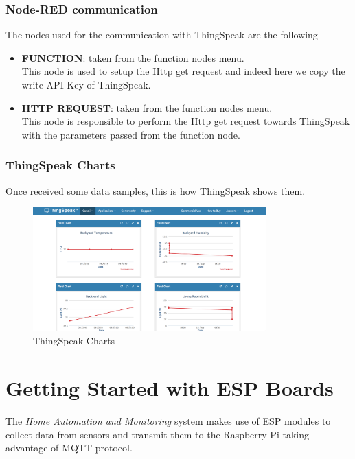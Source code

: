 \subsubsection{Node-RED communication}

The nodes used for the communication with ThingSpeak are the following
\begin{itemize}
    \item \textbf{FUNCTION}: taken from the function nodes menu. \\
    This node is used to setup the Http get request and indeed here we copy the write API Key of ThingSpeak.
    \item \textbf{HTTP REQUEST}: taken from the function nodes menu. \\
    This node is responsible to perform the Http get request towards ThingSpeak with the parameters passed from the function node.
\end{itemize}

\subsubsection{ThingSpeak Charts}
Once received some data samples, this is how ThingSpeak shows them.

\begin{figure}[H]
	\begin{center}
		\includegraphics[width=0.8\textwidth]{./pictures/thingspeak-channel-charts}
		\caption{ThingSpeak Charts}
		\label{mqtt_functioning}
	\end{center}
\end{figure}
\section{Getting Started with ESP Boards}

The \textit{Home Automation and Monitoring} system makes use of ESP modules to collect data from sensors and transmit them to the Raspberry Pi taking advantage of MQTT protocol.


